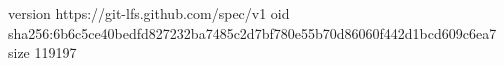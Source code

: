 version https://git-lfs.github.com/spec/v1
oid sha256:6b6c5ce40bedfd827232ba7485c2d7bf780e55b70d86060f442d1bcd609c6ea7
size 119197
